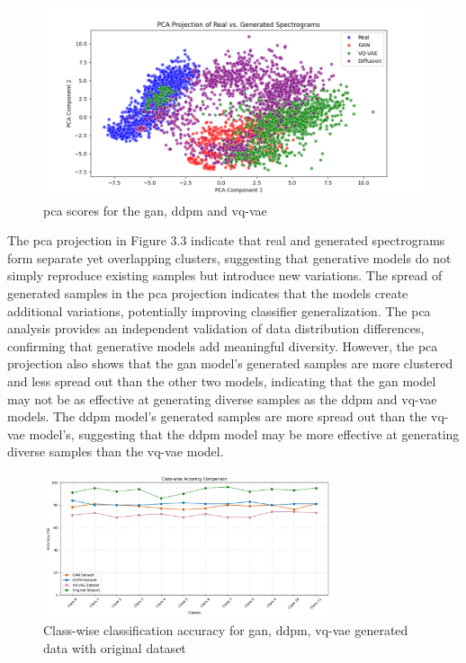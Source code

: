 \begin{figure}[h]
\includegraphics[width=\textwidth]{figures/PCA (1).png}
\centering
\caption{ \gls{pca} scores for the \gls{gan}, \gls{ddpm} and \gls{vq-vae}}
\centering
\end{figure}
The \gls{pca} projection in Figure 3.3 indicate that real and generated spectrograms form separate yet overlapping clusters, suggesting that generative models do not simply reproduce existing samples but introduce new variations. The spread of generated samples in the \gls{pca} projection indicates that the models create additional variations, potentially improving classifier generalization. The \gls{pca} analysis provides an independent validation of data distribution differences, confirming that generative models add meaningful diversity.
However, the \gls{pca} projection also shows that the \gls{gan} model's generated samples are more clustered and less spread out than the other two models, indicating that the \gls{gan} model may not be as effective at generating diverse samples as the \gls{ddpm} and \gls{vq-vae} models. The \gls{ddpm} model's generated samples are more spread out than the \gls{vq-vae} model's, suggesting that the \gls{ddpm} model may be more effective at generating diverse samples than the \gls{vq-vae} model.


\begin{figure}[t]
    \includegraphics[width=8.5cm]{figures/graph_1.png}
    \centering
    \caption{Class-wise classification accuracy for \gls{gan}, \gls{ddpm}, \gls{vq-vae} generated data with original dataset}
    \centering
    \end{figure}
    
